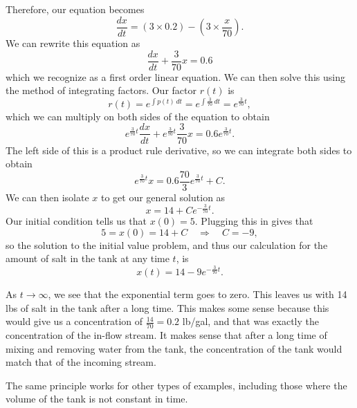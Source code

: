 \begin{exampleSol}
Therefore, our equation becomes
\begin{equation*}
\frac{dx}{dt} = (3\times 0.2) - \left(3 \times \frac{x}{70}\right).
\end{equation*} 
We can rewrite this equation as
\begin{equation*}
\frac{dx}{dt} + \frac{3}{70}x = 0.6
\end{equation*}
which we recognize as a first order linear equation. We can then solve this using the method of integrating factors. Our factor $r(t)$ is
\begin{equation*}
r(t) = e^{\int p(t)\, dt} = e^{\int \frac{3}{70}\, dt} = e^{\frac{3}{70} t},
\end{equation*}
which we can multiply on both sides of the equation to obtain
\begin{equation*}
e^{\frac{3}{70} t} \frac{dx}{dt} + e^{\frac{3}{70} t} \frac{3}{70} x = 0.6 e^{\frac{3}{70} t}.
\end{equation*}
The left side of this is a product rule derivative, so we can integrate both sides to obtain
\begin{equation*}
e^{\frac{3}{70} t} x = 0.6 \frac{70}{3} e^{\frac{3}{70} t} + C.
\end{equation*}
We can then isolate $x$ to get our general solution as
\begin{equation*}
x = 14 + Ce^{-\frac{3}{70} t}.
\end{equation*}
Our initial condition tells us that $x(0) = 5$. Plugging this in gives that
\begin{equation*}
5 = x(0) = 14 + C \quad \Rightarrow \quad C = -9,
\end{equation*}
so the solution to the initial value problem, and thus our calculation for the amount of salt in the tank at any time $t$, is
\begin{equation*}
x(t) = 14 - 9e^{-\frac{3}{70} t}.
\end{equation*}

As $t\rightarrow \infty$, we see that the exponential term goes to zero. This leaves us with 14 lbs of salt in the tank after a long time. This makes some sense because this would give us a concentration of $\frac{14}{70} = 0.2$ lb/gal, and that was exactly the concentration of the in-flow stream. It makes sense that after a long time of mixing and removing water from the tank, the concentration of the tank would match that of the incoming stream.
\end{exampleSol}

The same principle works for other types of examples, including those where the volume of the tank is not constant in time. 

